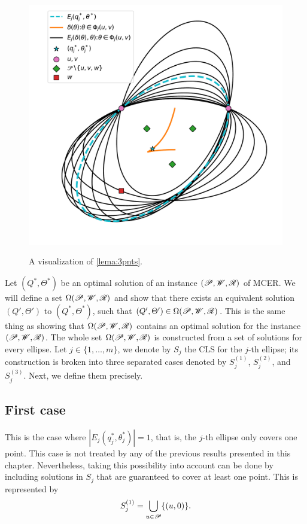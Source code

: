 \begin{figure}[H]
	\centering
	\caption{A visualization of \autoref{lema:3pnts}.}
	\includegraphics[scale=.6]{tex/figures/lema-3-points}
	\fautor
	\label{fig:lema-3-points}
\end{figure}

Let $(Q^*, \Theta^*)$ be an optimal solution of an instance $(\mathscr{P}, \mathscr{W}, \mathscr{R})$ of MCER. We will define a set $\Omega(\mathscr{P}, \mathscr{W}, \mathscr{R})$ and show that there exists an equivalent solution $(Q', \Theta')$ to  $(Q^*, \Theta^*)$, such that $(Q', \Theta') \in \Omega(\mathscr{P}, \mathscr{W}, \mathscr{R})$. This is the same thing as showing that $\Omega(\mathscr{P}, \mathscr{W}, \mathscr{R})$ contains an optimal solution for the instance $(\mathscr{P}, \mathscr{W}, \mathscr{R})$.
The whole set $\Omega(\mathscr{P}, \mathscr{W}, \mathscr{R})$ is constructed from a set of solutions for every ellipse. Let $j\in\{1, \dots, m\}$, we denote by $S_j$ the CLS for the $j$-th ellipse; its construction is broken into three separated cases denoted by $S_j^{(1)}$, $S_j^{(2)}$, and $S_j^{(3)}$. Next, we define them precisely.

\subsection{First case}

This is the case where $|E_j(q_j^*, \theta_j^*)|=1$, that is, the $j$-th ellipse only covers one point. 
This case is not treated by any of the previous results presented in this chapter. Nevertheless, taking this possibility into account can be done by including solutions in $S_j$ that are guaranteed to cover at least one point. This is represented by
\begin{equation}
	S_j^{(1)} = \bigcup_{u \in \mathscr{P}} \{(u, 0)\}.
\end{equation}

